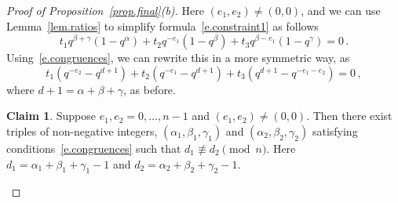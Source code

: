 \documentclass[12pt]{amsart}
\numberwithin{equation}{section}
\numberwithin{subsection}{section}
\theoremstyle{definition} \newtheorem{definition}[theorem]{Definition}
\newtheorem*{claim}{Claim}
\begin{document}
\begin{proof}[Proof of Proposition~\ref{prop.final}(b)]
Here $(e_1, e_2) \neq (0, 0)$, and we can
use Lemma~\ref{lem.ratios} to simplify formula~\eqref{e.constraint1}
as follows
\[  t_1 q^{\beta + \gamma}(1-q^{\alpha}) + 
 t_2 q^{-e_1} (1 - q^{\beta}) 
 + t_3 q^{\beta - e_1}(1 - q^{\gamma}) = 0 \, . \] 
Using~\eqref{e.congruences}, we can rewrite this in a more symmetric way,
as
\begin{equation} \label{e.constraint2}
t_1 (q^{-e_2} - q^{d+1}) + t_2 (q^{-e_1} - q^{d+1}) 
+ t_3 (q^{d+1} - q^{-e_1 - e_2}) = 0 \, , 
\end{equation}
where $d + 1 = \alpha + \beta + \gamma$, as before.

\smallskip
\begin{claim} Suppose $e_1, e_2 = 0, \dots, n-1$ and $(e_1, e_2) \neq (0, 0)$.
Then there exist triples of non-negative integers, 
$(\alpha_1, \beta_1, \gamma_1)$ and $(\alpha_2, \beta_2, \gamma_2)$ 
satisfying conditions~\eqref{e.congruences}
such that $d_1 \not \equiv d_2 \pmod{n}$. 
Here $d_1 = \alpha_1 + \beta_1 + 
\gamma_1 - 1$ and $d_2 = \alpha_2 + \beta_2 + \gamma_2 - 1$. 
\end{claim}


\end{proof}
\end{document}
